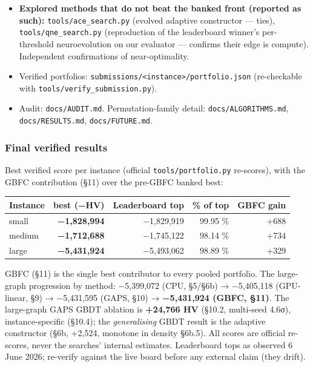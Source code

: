 \documentclass[
  11pt,
]{article}
\begin{document}
\begin{itemize}
  \texttt{tools/gbfc.py} (gradient-boosted front construction;
  iterate→re-pool→repeat). The single best contributor on all three
  instances (+688 / +734 / +329 HV). Hybrid with the SOTA neuroevolution
  (+ \texttt{-\/-no-gbdt} ablation): \texttt{tools/qnegbfc.py}.
\item
  \textbf{Explored methods that do not beat the banked front (reported
  as such):} \texttt{tools/ace\_search.py} (evolved adaptive constructor
  --- ties), \texttt{tools/qne\_search.py} (reproduction of the
  leaderboard winner's per-threshold neuroevolution on our evaluator ---
  confirms their edge is compute). Independent confirmations of
  near-optimality.
\item
  Verified portfolios:
  \texttt{submissions/\textless{}instance\textgreater{}/portfolio.json}
  (re-checkable with \texttt{tools/verify\_submission.py}).
\item
  Audit: \texttt{docs/AUDIT.md}. Permutation-family detail:
  \texttt{docs/ALGORITHMS.md}, \texttt{docs/RESULTS.md},
  \texttt{docs/FUTURE.md}.
\end{itemize}

\hypertarget{final-verified-results}{%
\subsubsection{Final verified results}\label{final-verified-results}}

Best verified score per instance (official \texttt{tools/portfolio.py}
re-scores), with the GBFC contribution (§11) over the pre-GBFC banked
best:

\begin{longtable}[]{@{}lrrrr@{}}
\toprule
Instance & best (−HV) & Leaderboard top & \% of top & GBFC
gain\tabularnewline
\midrule
\endhead
small & \textbf{−1,828,994} & −1,829,919 & 99.95 \% &
+688\tabularnewline
medium & \textbf{−1,712,688} & −1,745,122 & 98.14 \% &
+734\tabularnewline
large & \textbf{−5,431,924} & −5,493,062 & 98.89 \% &
+329\tabularnewline
\bottomrule
\end{longtable}

GBFC (§11) is the single best contributor to every pooled portfolio. The
large-graph progression by method: −5,399,072 (CPU, §5/§6b) → −5,405,118
(GPU-linear, §9) → −5,431,595 (GAPS, §10) → \textbf{−5,431,924 (GBFC,
§11)}. The large-graph GAPS GBDT ablation is \textbf{+24,766 HV} (§10.2,
multi-seed 4.6σ), instance-specific (§10.4); the \emph{generalising}
GBDT result is the adaptive constructor (§6b, +2,524, monotone in
density §6b.5). All scores are official re-scores, never the searches'
internal estimates. Leaderboard tops as observed 6 June 2026; re-verify
against the live board before any external claim (they drift).
\end{document}
